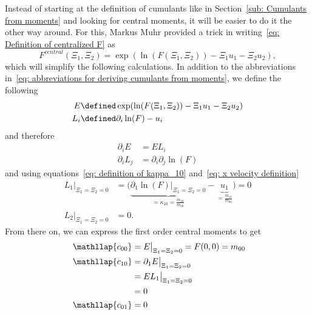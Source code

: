 Instead of starting at the definition of cumulants like in Section~\ref{sub: Cumulants from moments} and looking for central moments, it will be easier to do it the other way around.
For this, Markus Muhr provided a trick in writing~\eqref{eq: Definition of centralized F} as
\begin{equation*}
  F^{central}(\Xi_1, \Xi_2) = \exp(\ln(F(\Xi_1,\Xi_2)) - \Xi_1 u_1 - \Xi_2 u_2),
\end{equation*}
which will simplify the following calculations.
In addition to the abbreviations in~\eqref{eq: abbreviations for deriving cumulants from moments}, we define the following
\begin{equation}
  \label{eq: additional abbreviations}
  \begin{aligned}
    E & \defined \exp(\ln(F(\Xi_1,\Xi_2)) - \Xi_1 u_1 - \Xi_2 u_2) \\
    L_i & \defined \partial_i \ln(F) - u_i
  \end{aligned}
\end{equation}
and therefore
\begin{equation*}
  \begin{aligned}
    \partial_i E & = EL_i \\
    \partial_i L_j & = \partial_i\partial_j\ln(F)
  \end{aligned}
\end{equation*}
and using equations~\eqref{eq: definition of kappa_10} and~\eqref{eq: x velocity definition}
\begin{equation*}
  \begin{aligned}
    L_1\bigr|_{\Xi_1=\Xi_2 = 0} & = \bigg(
      \underbrace{ \partial_1\ln(F) \bigr|_{\Xi_1=\Xi_2 = 0}}_{ = \kappa_{10} = \frac{m_{10}}{m_{00}}}
      - \underbrace{u_1}_{ = \frac{m_{10}}{m_{00}}} \bigg) = 0 \\
    L_2\bigr|_{\Xi_1=\Xi_2 = 0} & = 0.
  \end{aligned}
\end{equation*}
From there on, we can express the first order central moments to get
\begin{align*}
  \phantom{c_{00}}
  &\begin{aligned}
  \nonumber
    \mathllap{c_{00}} & = E\bigr|_{\Xi_1=\Xi_2 = 0} = F(0,0) = m_{00}
  \end{aligned}\\
  &\begin{aligned}
  \nonumber
    \mathllap{c_{10}} & =  \partial_1 E  \bigr|_{\Xi_1=\Xi_2 = 0} \\
    & = EL_1  \bigr|_{\Xi_1=\Xi_2 = 0} \\
    & = 0
  \end{aligned}\\
  &\begin{aligned}
  \nonumber
    \mathllap{c_{01}} & = 0
  \end{aligned}\\
\end{align*}

